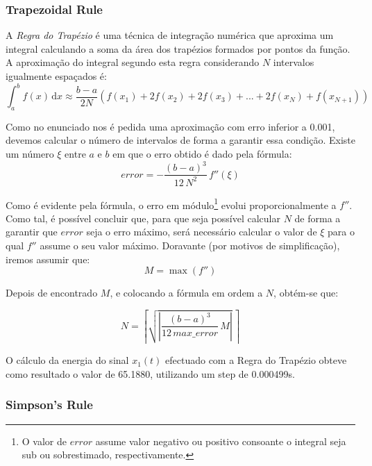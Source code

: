 \documentclass[a4paper]{article}
\begin{document}
\subsubsection{Trapezoidal Rule}
\noindent A \emph{Regra do Trapézio} é uma técnica de integração numérica que aproxima um integral calculando a soma da área dos trapézios formados por pontos da função. A aproximação do integral segundo esta regra considerando $N$ intervalos igualmente espaçados é:
\begin{equation}
\int_{a}^{b} f(x) \, \mathrm{d} x \approx \frac{b-a}{2N} (f(x_{1}) + 2 f(x_{2}) + 2 f(x_{3}) + ... + 2 f(x_{N}) + f(x_{N+1}))
\end{equation}

\noindent Como no enunciado nos é pedida uma aproximação com erro inferior a 0.001, devemos calcular o número de intervalos de forma a garantir essa condição. Existe um número $\xi$ entre $a$ e $b$ em que o erro obtido é dado pela fórmula:
\begin{equation}
error = -\frac{(b-a)^3}{12 \, N^2} \, f''(\xi)
\end{equation}

\noindent Como é evidente pela fórmula, o erro em módulo\footnote{O valor de $error$ assume valor negativo ou positivo consoante o integral seja sub ou sobrestimado, respectivamente.} evolui proporcionalmente a $f''$. Como tal, é possível concluir que, para que seja possível calcular $N$ de forma a garantir que $error$ seja o erro máximo, será necessário calcular o valor de $\xi$ para o qual $f''$ assume o seu valor máximo. Doravante (por motivos de simplificação), iremos assumir que:
\begin{equation}
M = \max(f'')
\end{equation}

\noindent Depois de encontrado $M$, e colocando a fórmula em ordem a $N$, obtém-se que:

\begin{equation}
N = \left\lceil \sqrt{\left| \frac{(b-a)^3}{12 \, max\_error} \, M \right|} \, \right\rceil
\end{equation}

O cálculo da energia do sinal $x_{1}(t)$ efectuado com a Regra do Trapézio obteve como resultado o valor de 65.1880, utilizando um step de 0.000499s.

\subsubsection{Simpson's Rule}
\end{document}
